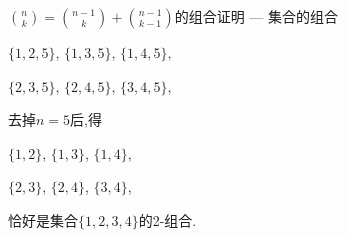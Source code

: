 \documentclass[10pt,punct]{ctexbeamer}
\begin{document}
\begin{frame}{$\binom{n}{k}=\binom{n-1}{k}+\binom{n-1}{k-1}$的组合证明 --- 集合的组合}
\begin{minipage}{0.49\linewidth}
\begin{flushleft}
\begin{itemize}
{                \begin{center}
                    $\{1,2,5\}$, $\{1,3,5\}$, $\{1,4,5\},$

                    $\{2,3,5\}$, $\{2,4,5\}$, $\{3,4,5\}$,
                \end{center}


                去掉$n=5$后,得

                \begin{center}
                    $\{1,2\}$, $\{1,3\}$, $\{1,4\}$,

                    $\{2,3\}$, $\{2,4\}$, $\{3,4\}$,
                \end{center}

                恰好是集合$\{1,2,3,4\}$的2-组合.}
            \end{itemize}

        \end{flushleft}
    \end{minipage}


\end{frame}
\end{document}
